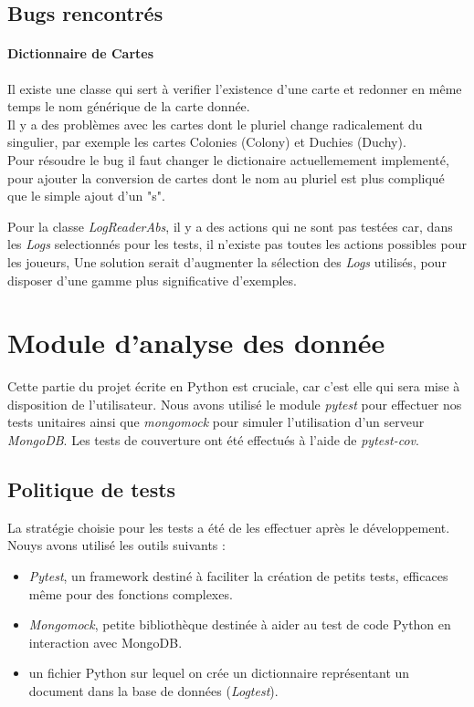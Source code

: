 \subsection{Bugs rencontrés}

\paragraph*{Dictionnaire de Cartes} 

Il existe une classe qui sert à verifier l'existence d'une carte et redonner en même temps le nom générique de la carte donnée.\\
Il y a des problèmes avec les cartes dont le pluriel change radicalement du singulier, par exemple les cartes Colonies (Colony) et Duchies (Duchy). \\

Pour résoudre le bug il faut changer le dictionaire actuellemement implementé, pour ajouter la conversion de cartes dont le nom au pluriel est plus compliqué que le simple ajout d'un "s".


Pour la classe \textit{LogReaderAbs}, il y a des actions qui ne sont pas testées car, dans les \textit{Logs} selectionnés pour les tests, il n'existe pas toutes les actions possibles pour les joueurs, Une solution serait d'augmenter la sélection des \textit{Logs} utilisés, pour disposer d'une gamme plus significative d'exemples.


\section{Module d'analyse des donnée}
Cette partie du projet écrite en Python est cruciale, car c'est elle qui sera mise à disposition de  l'utilisateur. Nous avons utilisé le module \textit{pytest} pour effectuer nos tests unitaires ainsi que \textit{mongomock} pour simuler l'utilisation d'un serveur \textit{MongoDB}. Les tests de couverture ont été effectués à l'aide de \textit{pytest-cov}.

\subsection{Politique de tests}
La stratégie choisie pour les tests a été de les effectuer après le développement. Nouys avons utilisé les outils suivants : 
\begin{itemize}
\item \textit{Pytest}, un framework destiné à faciliter la création de petits tests, efficaces même pour des fonctions complexes.
\item \textit{Mongomock}, petite bibliothèque destinée à aider au test de code Python en interaction avec MongoDB.
\item un fichier Python sur lequel on crée un dictionnaire représentant un document dans la base de données (\textit{Logtest}).
\end{itemize}

